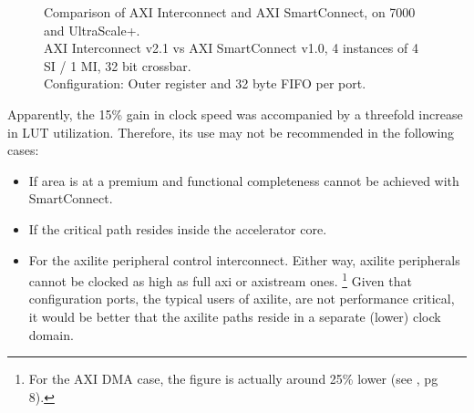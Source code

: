 \begin{figure}[ht!]
\centering
{}
\caption{Comparison of AXI Interconnect and AXI SmartConnect, on 7000 and UltraScale+.\\
	AXI Interconnect v2.1 vs AXI SmartConnect v1.0, 4 instances of 4 SI / 1 MI, 32 bit crossbar.\\ 
	Configuration: Outer register and 32 byte FIFO per port.}
\label{tab:smartconnect}
\end{figure}

Apparently, the 15\% gain in clock speed was accompanied by a threefold increase in LUT utilization. 
Therefore, its use may not be recommended in the following cases:

\begin{itemize}
\item	If area is at a premium and functional completeness cannot be achieved with SmartConnect.
\item	If the critical path resides inside the accelerator core.
\item	For the \gls{axilite} peripheral control interconnect. Either way, \gls{axilite} peripherals
	cannot be clocked as high as full \gls{axi} or \gls{axistream} ones.
	\footnote{For the AXI DMA case, the figure is actually around 25\% 
	lower (see \cite{pg021}, pg 8).} Given that configuration
	ports, the typical users of \gls{axilite}, are not performance critical, it would be
	better that the \gls{axilite} paths reside in a separate (lower) clock domain.
\end{itemize}


